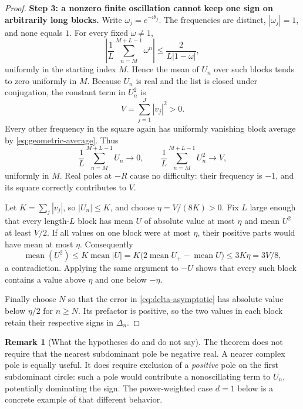 \documentclass[11pt,letterpaper]{article}
\theoremstyle{definition}
\newtheorem{remark}[theorem]{Remark}
\newcommand{\Delt}{\Delta}
\newcommand{\ii}{\mathrm i}
\numberwithin{equation}{section}
\begin{document}
\begin{proof}
\textbf{Step 3: a nonzero finite oscillation cannot keep one sign on
arbitrarily long blocks.}
Write $\omega_j=e^{-\ii\theta_j}$. The frequencies are distinct,
$|\omega_j|=1$, and none equals $1$. For every fixed $\omega\ne1$,
\begin{equation}\label{eq:geometric-average}
\left|\frac1L\sum_{n=M}^{M+L-1}\omega^n\right|
\le\frac{2}{L|1-\omega|},
\end{equation}
uniformly in the starting index $M$. Hence the mean of $U_n$ over such
blocks tends to zero uniformly in $M$.
Because $U_n$ is real and the list is closed under conjugation, the
constant term in $U_n^2$ is
\begin{equation}\label{eq:variance}
V=\sum_{j=1}^J|v_j|^2>0.
\end{equation}
Every other frequency in the square again has uniformly vanishing
block average by \eqref{eq:geometric-average}. Thus
\begin{equation}\label{eq:uniform-moments}
\frac1L\sum_{n=M}^{M+L-1}U_n\longrightarrow0,
\qquad
\frac1L\sum_{n=M}^{M+L-1}U_n^2\longrightarrow V,
\end{equation}
uniformly in $M$. Real poles at $-R$ cause no difficulty: their frequency
is $-1$, and its square correctly contributes to $V$.

Let $K=\sum_j|v_j|$, so $|U_n|\le K$, and choose
$\eta=V/(8K)>0$. Fix $L$ large enough that every length-$L$ block has
mean $U$ of absolute value at most $\eta$ and mean $U^2$ at least $V/2$.
If all values on one block were at most $\eta$, their positive parts
would have mean at most $\eta$. Consequently
\[
\operatorname{mean}(U^2)
\le K\operatorname{mean}|U|
=K\bigl(2\operatorname{mean}U_+-\operatorname{mean}U\bigr)
\le3K\eta=3V/8,
\]
a contradiction. Applying the same argument to $-U$ shows that every
such block contains a value above $\eta$ and one below $-\eta$.

Finally choose $N$ so that the error in \eqref{eq:delta-asymptotic} has
absolute value below $\eta/2$ for $n\ge N$. Its prefactor is positive,
so the two values in each block retain their respective signs in
$\Delt_n$.
\end{proof}

\begin{remark}[What the hypotheses do and do not say]
The theorem does not require that the nearest subdominant pole be negative
real. A nearer complex pole is equally useful. It does require exclusion
of a \emph{positive} pole on the first subdominant circle: such a pole
would contribute a nonoscillating term to $U_n$, potentially dominating
the sign. The power-weighted case $d=1$ below is a concrete example of
that different behavior.
\end{remark}
\end{document}
